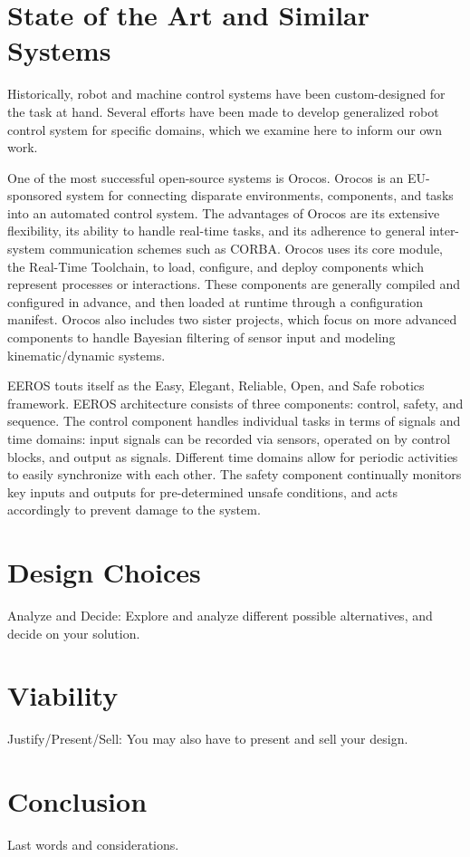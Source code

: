 \documentclass{article}
\begin{document}
\section{State of the Art and Similar Systems}
Historically, robot and machine control systems have been custom-designed for the task at hand.  Several efforts have been made to develop generalized robot control system for specific domains, which we examine here to inform our own work.

One of the most successful open-source systems is Orocos.  Orocos is an EU-sponsored system for connecting disparate environments, components, and tasks into an automated control system.  The advantages of Orocos are its extensive flexibility, its ability to handle real-time tasks, and its adherence to general inter-system communication schemes such as CORBA.  Orocos uses its core module, the Real-Time Toolchain, to load, configure, and deploy components which represent processes or interactions.  These components are generally compiled and configured in advance, and then loaded at runtime through a configuration manifest.  Orocos also includes two sister projects, which focus on more advanced components to handle Bayesian filtering of sensor input and modeling kinematic/dynamic systems.

EEROS touts itself as the Easy, Elegant, Reliable, Open, and Safe robotics framework.  EEROS architecture consists of three components: control, safety, and sequence.  The control component handles individual tasks in terms of signals and time domains: input signals can be recorded via sensors, operated on by control blocks, and output as signals.  Different time domains allow for periodic activities to easily synchronize with each other.  The safety component continually monitors key inputs and outputs for pre-determined unsafe conditions, and acts accordingly to prevent damage to the system.

\section{Design Choices}
Analyze and Decide:
Explore and analyze different possible
alternatives, and decide on your solution.

\section{Viability}
Justify/Present/Sell:
You may also have to present and sell your
design.

\section{Conclusion}
Last words and considerations.
\end{document}

